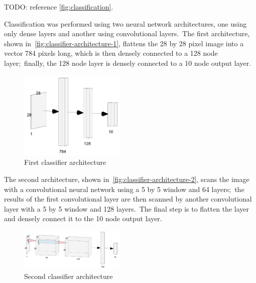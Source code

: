 \documentclass[conference]{IEEEtran}
\begin{document}
    TODO: reference \autoref{fig:classification}.

    Classification was performed using two neural network architectures, one using only dense layers and another using convolutional layers.\ The first architecture, shown in~\autoref{fig:classifier-architecture-1}, flattens the 28 by 28 pixel image into a vector 784 pixels long, which is then densely connected to a 128 node layer;\ finally, the 128 node layer is densely connected to a 10 node output layer.

    \begin{figure}
        \caption{First classifier architecture}
        \label{fig:classifier-architecture-1}
        \begin{center}
            \includegraphics[width=0.45\textwidth]{First_Classifier_Architecture.png}
        \end{center}
    \end{figure}

    The second architecture, shown in~\autoref{fig:classifier-architecture-2}, scans the image with a convolutional neural network using a 5 by 5 window and 64 layers;\ the results of the first convolutional layer are then scanned by another convolutional layer with a 5 by 5 window and 128 layers.\ The final step is to flatten the layer and densely connect it to the 10 node output layer.

    \begin{figure}
        \caption{Second classifier architecture}
        \label{fig:classifier-architecture-2}
        \begin{center}
            \includegraphics[width=0.45\textwidth]{Second_Classifier_Architecture.png}
        \end{center}
    \end{figure}
\end{document}
